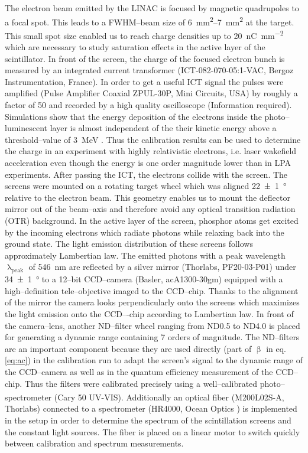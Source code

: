 \documentclass[%
preprint,
amsmath,
amssymb,
aip,
rsi, 
numerical,
floatfix,
]{revtex4-1}
\newcommand{\myCite}[1]{\textcolor{blue}{\cite{#1}}}
\begin{document}
The electron beam emitted by the LINAC is focused by magnetic quadrupoles to a focal spot.
This leads to a FWHM--beam size of \SIrange{6}{7}{\milli\metre^2} at the target.
This small spot size enabled us to reach charge densities up to \SI[per-mode=symbol]{20}{\nano\coulomb \per \square\milli\meter} which are necessary to study saturation effects in the active layer of the scintillator.
In front of the screen, the charge of the focused electron bunch is measured by an integrated current transformer (ICT-082-070-05:1-VAC, Bergoz Instrumentation, France). 
In order to get a useful ICT signal the pulses were amplified (Pulse Amplifier Coaxial ZPUL-30P, Mini Circuits, USA) by roughly a factor of 50 and recorded by a high quality oscilloscope (Information required).
Simulations show that the energy deposition of the electrons inside the photo--luminescent layer is almost independent of the their kinetic energy above a threshold--value of \SI{3}{\mega\electronvolt} \myCite{Hidding2007,Glinec2006,Masuda2008}.
Thus the calibration results can be used to determine the charge in an experiment with highly relativistic electrons, i.e. laser wakefield acceleration even though the energy is one order magnitude lower than in LPA experiments. 
After passing the ICT, the electrons collide with the screen. 
The screens were mounted on a rotating target wheel which was aligned \SI[separate-uncertainty = true]{22(1)}{\degree} relative to the electron beam.
This geometry enables us to mount the deflector mirror out of the beam--axis and therefore avoid any optical transition radiation (OTR) background. 
In the active layer of the screen, phosphor atoms get excited by the incoming electrons which radiate photons while relaxing back into the ground state. 
The light emission distribution of these screens follows approximately Lambertian law\myCite{Giakoumakis1985}. 
The emitted photons with a peak wavelength $\uplambda_{\text{peak}}$ of \SI{546}{\nano\metre} are reflected by a silver mirror (Thorlabs, PF20-03-P01) under \SI[separate-uncertainty = true]{34(1)}{\degree} to a 12–bit CCD–camera (Basler, acA1300-30gm) equipped with a high--definition tele--objective imaged to the CCD--chip. 
Thanks to the alignment of the mirror the camera looks perpendicularly onto the screens which maximizes the light emission onto the CCD–-chip according to Lambertian law. 
In front of the camera--lens, another ND--filter wheel ranging from ND0.5 to ND4.0 is placed for generating a dynamic range containing 7 orders of magnitude. 
The ND--filters are an important component because they are used directly (part of $\upbeta$ in eq. \ref{eq:ac}) in the calibration run to adapt the screen's signal to the dynamic range of the CCD--camera as well as in the quantum efficiency measurement of the CCD--chip.
Thus the filters were calibrated precisely using a well--calibrated photo--spectrometer (Cary\textsuperscript{\textregistered} 50 UV-VIS).
Additionally an optical fiber (M200L02S-A, Thorlabs) connected to a spectrometer (HR4000, Ocean Optics ) is implemented in the setup in order to determine the spectrum of the scintillation screens and the constant light sources.
The fiber is placed on a linear motor to switch quickly between calibration and spectrum measurements. 
 
\end{document}
